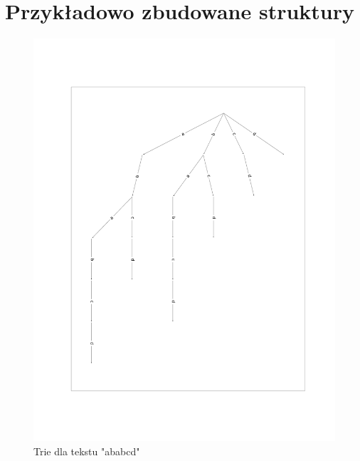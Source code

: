 \documentclass{article}
\begin{document}
	\section{Przykładowo zbudowane struktury}
	\begin{figure}[htp]
	\centering
	\includegraphics[width = \textwidth]{trie_example.png}
	\caption{Trie dla tekstu "ababcd"}
	\label{}
	\end{figure}
	
\end{document}
